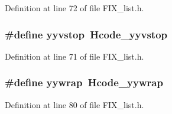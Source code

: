 Definition at line 72 of file FIX\_\-list.h.
\subsubsection{\setlength{\rightskip}{0pt plus 5cm}\#define \bf{yyvstop}~Hcode\_\-yyvstop}\label{FIX__list_8h_9ca02f47c15552d622ca2eb1861eae31}




Definition at line 71 of file FIX\_\-list.h.
\subsubsection{\setlength{\rightskip}{0pt plus 5cm}\#define yywrap~Hcode\_\-yywrap}\label{FIX__list_8h_5be541efdb129f7cefb2437f52fe7359}




Definition at line 80 of file FIX\_\-list.h.